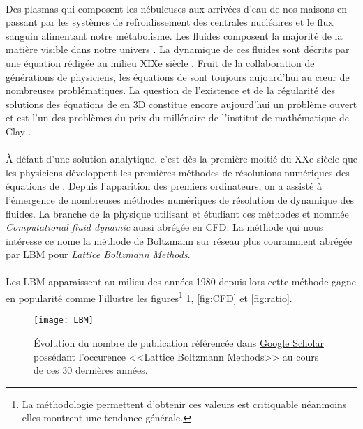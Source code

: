 \paragraph*{}
  Des plasmas qui composent les nébuleuses aux arrivées d'eau de nos maisons en passant par les systèmes de
  refroidissement des centrales nucléaires et le flux sanguin alimentant notre métabolisme.
  Les fluides composent la majorité de la matière visible dans notre univers \cite{plasma}.
  La dynamique de ces fluides sont décrits par une équation rédigée au milieu XIXe siècle \cite{wiki:NS}.
  Fruit de la collaboration de générations de physiciens, les équations de \NS{} sont toujours aujourd'hui au cœur de
  nombreuses problématiques.
  La question de l'existence et de la régularité des solutions des équations de \NS{} en 3D constitue encore aujourd'hui 
  un problème ouvert et est l'un des problèmes du prix du millénaire de l'institut de mathématique de Clay 
  \cite{wiki:Mil}.

\paragraph*{}
  À défaut d'une solution analytique, c'est dès la première moitié du XXe siècle que les physiciens développent les
  premières méthodes de résolutions numériques des équations de \NS{} \cite{Hunt1998}.
  Depuis l'apparition des premiers ordinateurs, on a assisté à l'émergence de nombreuses méthodes numériques de résolution 
  de dynamique des fluides.
  La branche de la physique utilisant et étudiant ces méthodes et nommée \emph{Computational fluid dynamic} aussi abrégée 
  en CFD.
  La méthode qui nous intéresse ce nome la méthode de Boltzmann sur réseau plus couramment abrégée par LBM pour 
  \emph{Lattice Boltzmann Methods}.

\paragraph*{}
  Les LBM apparaissent au milieu des années 1980 \cite{D'HUMIERES1985, d_Humi_res_1986, PhysRevLett.56.1505, 
  DHUMIERES2009821} depuis lors cette méthode gagne en popularité comme l'illustre les 
  figures\footnote{La méthodologie permettent d'obtenir ces valeurs est critiquable néanmoins elles montrent une tendance 
  générale.} \ref{fig:LBM}, \ref{fig:CFD} et \ref{fig:ratio}.

\begin{figure}[htp]
  \center
  \texttt{[image: LBM]} 
  \caption{Évolution du nombre de publication référencée dans \href{https://scholar.google.fr/}{Google Scholar} 
              possédant l'occurence <<Lattice Boltzmann Methods>> au cours de ces 30 dernières années.}
  \label{fig:LBM}
\end{figure}

